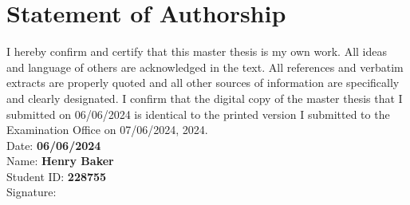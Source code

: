 \chapter*{Statement of Authorship}
I hereby confirm and certify that this master thesis is my own work. All ideas and language
of others are acknowledged in the text. All references and verbatim extracts are properly 
quoted and all other sources of information are specifically and clearly designated. I 
confirm that the digital copy of the master thesis that I submitted on 06/06/2024 is identical to the printed version I submitted to the Examination Office on 07/06/2024, 2024.\\

Date: \textbf{06/06/2024}\\

Name: \textbf{Henry Baker}\\

Student ID: \textbf{228755}\\

Signature: \dottedline[6cm]
